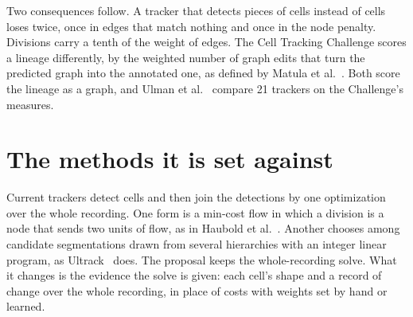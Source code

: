 Two consequences follow. A tracker that detects pieces of cells instead of cells loses twice, once in edges that match nothing and once in the node penalty. Divisions carry a tenth of the weight of edges. The Cell Tracking Challenge scores a lineage differently, by the weighted number of graph edits that turn the predicted graph into the annotated one, as defined by Matula et al.~\cite{src:Matula-2015}. Both score the lineage as a graph, and Ulman et al.~\cite{src:Ulman-2017} compare 21 trackers on the Challenge's measures.

\section{\texorpdfstring{The methods it is set against}{The methods it is set against}}

Current trackers detect cells and then join the detections by one optimization over the whole recording. One form is a min-cost flow in which a division is a node that sends two units of flow, as in Haubold et al.~\cite{src:Haubold-2016}. Another chooses among candidate segmentations drawn from several hierarchies with an integer linear program, as Ultrack~\cite{src:Ultrack} does. The proposal keeps the whole-recording solve. What it changes is the evidence the solve is given: each cell's shape and a record of change over the whole recording, in place of costs with weights set by hand or learned.

